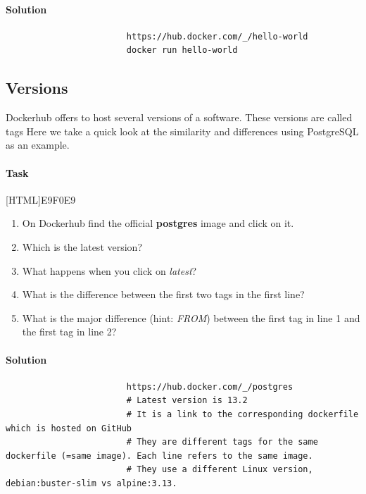 \documentclass[12pt]{article}
\begin{document}
			\paragraph{Solution}
				
				\begin{minipage}{\linewidth}
					\begin{lstlisting}
						https://hub.docker.com/_/hello-world
						docker run hello-world
					\end{lstlisting}
				\end{minipage}
	
	
		\subsection{Versions}
			Dockerhub offers to host several versions of a software.
			These versions are called tags
			Here we take a quick look at the similarity and differences using PostgreSQL as an example.
			 
			\paragraph{Task}
				[HTML]{E9F0E9}{\parbox{\linewidth}{%
						\begin{enumerate}
							\item On Dockerhub find the official  \textbf{postgres} image and click on it.
							\item Which is the latest version?
							\item What happens when you click on \textit{latest}?
							\item What is the difference between the first two tags in the first line?
							\item What is the major difference (hint: \textit{FROM}) between the first tag in line 1 and the first tag in line 2?
						\end{enumerate}
				}}
		
			\paragraph{Solution}
				\begin{minipage}{\linewidth}
					\begin{lstlisting}
						https://hub.docker.com/_/postgres
						# Latest version is 13.2
						# It is a link to the corresponding dockerfile which is hosted on GitHub 
						# They are different tags for the same dockerfile (=same image). Each line refers to the same image.
						# They use a different Linux version, debian:buster-slim vs alpine:3.13.  
					\end{lstlisting}
				\end{minipage}
	
\end{document}

